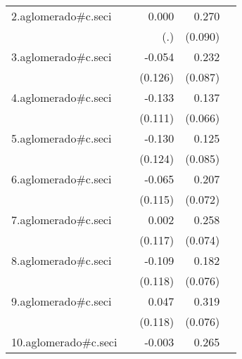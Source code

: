 {\begin{longtable}{l*{4}{D{.}{.}{-1}}}
\addlinespace
2.aglomerado#c.seci&                     &       0.000         &       0.270\sym{**} &                     \\
            &                     &         (.)         &     (0.090)         &                     \\
\addlinespace
3.aglomerado#c.seci&                     &      -0.054         &       0.232\sym{**} &                     \\
            &                     &     (0.126)         &     (0.087)         &                     \\
\addlinespace
4.aglomerado#c.seci&                     &      -0.133         &       0.137\sym{*}  &                     \\
            &                     &     (0.111)         &     (0.066)         &                     \\
\addlinespace
5.aglomerado#c.seci&                     &      -0.130         &       0.125         &                     \\
            &                     &     (0.124)         &     (0.085)         &                     \\
\addlinespace
6.aglomerado#c.seci&                     &      -0.065         &       0.207\sym{**} &                     \\
            &                     &     (0.115)         &     (0.072)         &                     \\
\addlinespace
7.aglomerado#c.seci&                     &       0.002         &       0.258\sym{***}&                     \\
            &                     &     (0.117)         &     (0.074)         &                     \\
\addlinespace
8.aglomerado#c.seci&                     &      -0.109         &       0.182\sym{*}  &                     \\
            &                     &     (0.118)         &     (0.076)         &                     \\
\addlinespace
9.aglomerado#c.seci&                     &       0.047         &       0.319\sym{***}&                     \\
            &                     &     (0.118)         &     (0.076)         &                     \\
\addlinespace
10.aglomerado#c.seci&                     &      -0.003         &       0.265\sym{***}&                     \\

\end{longtable}}
